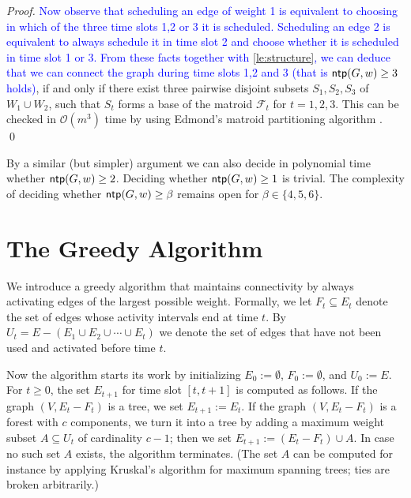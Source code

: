 \documentclass[runningheads]{llncs}
\newcommand{\bigO}{\mathcal{O}}
\DeclareMathOperator{\ntp}{\text{\sf ntp}}
\newcommand{\greedy}{\text{\sf Greedy}}
\newcommand{\lasse}[1]{\textcolor{blue}{#1}}
\begin{document}
\begin{proof}
\lasse{Now observe that scheduling an edge of weight 1 is equivalent to choosing in which of the three time slots 1,2 or 3 it is scheduled. Scheduling an edge 2 is equivalent to always schedule it in time slot 2 and choose whether it is scheduled in time slot 1 or 3. From these facts together with \cref{le:structure}, we can deduce that we can connect the graph during time slots 1,2 and 3 (that is $\ntp(G,w)\ge3$ holds)}, if and only if there exist three pairwise disjoint subsets
$S_1,S_2,S_3$ of $W_1 \cup W_2$, such that $S_t$ forms a base of the matroid $\mathcal{F}_t$ for $t=1,2,3$.
This can be checked in $\bigO(m^3)$ time by using Edmond's matroid partitioning algorithm \cite{edmonds1965minimum}.
\qed
\end{proof}

By a similar (but simpler) argument we can also decide in polynomial time whether $\ntp(G,w)\ge2$.
Deciding whether $\ntp(G,w)\ge1$ is trivial.
The complexity of deciding whether $\ntp(G,w)\ge\beta$ remains open for $\beta\in\{4,5,6\}$.


\section{The Greedy Algorithm}
\label{sec:greedy}
We introduce a greedy algorithm that maintains connectivity by always
activating edges of the largest possible weight.
Formally, we let $F_t\subseteq E_t$ denote the set of edges whose activity intervals 
end at time $t$.
By $U_t=E-(E_1\cup E_2\cup\cdots\cup E_t)$ we denote the set of edges that have not been 
used and activated before time $t$.

Now the {\greedy} algorithm starts its work by initializing 
$E_0:=\emptyset$, $F_0:=\emptyset$, and $U_0:=E$.
For $t\ge0$, the set $E_{t+1}$ for time slot $[t,t+1]$ is computed as follows.
If the graph $(V,E_t-F_t)$ is a tree, we set $E_{t+1}:=E_t$.
If the graph $(V,E_t-F_t)$ is a forest with $c$ components, we turn it into 
a tree by adding a maximum weight subset $A\subseteq U_t$ of cardinality $c-1$;
then we set $E_{t+1}:=(E_t-F_t)\cup A$.
In case no such set $A$ exists, the {\greedy} algorithm terminates.
(The set $A$ can be computed for instance by applying Kruskal's algorithm for 
maximum spanning trees; ties are broken arbitrarily.)
\end{document}

